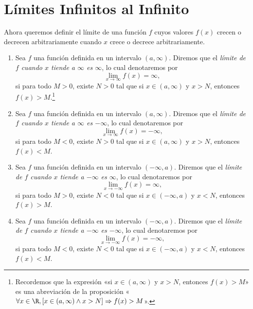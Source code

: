 \documentclass[12pt,a4paper]{book}
\begin{document}
    \section{Límites Infinitos al Infinito}\label{sec:infinitos-al-infinito}

    Ahora queremos definir el límite de una función $f$ cuyos valores $f(x)$
    crecen o decrecen arbitrariamente cuando $x$ crece o decrece arbitrariamente.

    \begin{definicion}\label{def:34}
        \begin{enumerate}
            \item Sea $f$ una función definida en un intervalo $(a,\infty)$. Diremos que el \textit{límite
            de $f$ cuando $x$ tiende a $\infty$ es $\infty$}, lo cual denotaremos por
            \begin{equation}\label{eq:4.30}
                \lim_{x\to\infty}f(x)=\infty,
            \end{equation}
            si para todo $M>0$, existe $N>0$ tal que si $x\in(a,\infty)$ y $x>N$, entonces
            $f(x)>M$.\footnote{Recordemos que la expresión «si $x\in(a,\infty)$ y $x>N$, entonces $f(x)>M$» es una
            abreviación de la proposición «$\forall x\in\R,[x\in(a,\infty)\wedge x>N]\Rightarrow f(x)>M$».}
            \item Sea $f$ una función definida en un intervalo $(a,\infty)$. Diremos que el \textit{límite
            de $f$ cuando $x$ tiende a $\infty$ es $-\infty$}, lo cual denotaremos por
            \begin{equation}\label{eq:4.31}
                \lim_{x\to\infty}f(x)=-\infty,
            \end{equation}
            si para todo $M<0$, existe $N>0$ tal que si $x\in(a,\infty)$ y $x>N$, entonces
            $f(x)<M$.
            \item Sea $f$ una función definida en un intervalo $(-\infty,a)$. Diremos que el \textit{límite
            de $f$ cuando $x$ tiende a $-\infty$ es $\infty$}, lo cual denotaremos por
            \begin{equation}\label{eq:4.32}
                \lim_{x\to-\infty}f(x)=\infty,
            \end{equation}
            si para todo $M>0$, existe $N<0$ tal que si $x\in(-\infty,a)$ y $x<N$, entonces
            $f(x)>M$.
            \item Sea $f$ una función definida en un intervalo $(-\infty,a)$. Diremos que el \textit{límite
            de $f$ cuando $x$ tiende a $-\infty$ es $-\infty$}, lo cual denotaremos por
            \begin{equation}\label{eq:4.33}
                \lim_{x\to-\infty}f(x)=-\infty,
            \end{equation}
            si para todo $M<0$, existe $N<0$ tal que si $x\in(-\infty,a)$ y $x<N$, entonces
            $f(x)<M$.
        \end{enumerate}
    \end{definicion}
\end{document}
